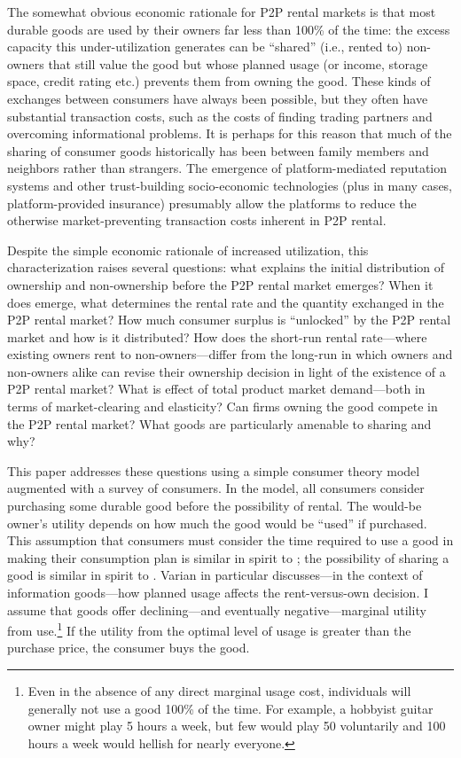 \documentclass[11pt]{article}
\begin{document}
The somewhat obvious economic rationale for P2P rental markets is that most durable goods are used by their owners far less than 100\% of the time: 
the excess capacity this under-utilization generates can be ``shared'' (i.e., rented to) non-owners that still value the good but whose planned usage (or income, storage space, credit rating etc.) prevents them from owning the good. 
These kinds of exchanges between consumers have always been possible, but they often have substantial transaction costs, such as the costs of finding trading partners and overcoming informational problems. 
It is perhaps for this reason that much of the sharing of consumer goods historically has been between family members and neighbors rather than strangers. 
The emergence of platform-mediated reputation systems and other trust-building socio-economic technologies (plus in many cases, platform-provided insurance) presumably allow the platforms to reduce the otherwise market-preventing transaction costs inherent in P2P rental. 

Despite the simple economic rationale of increased utilization, this characterization raises several questions:
what explains the initial distribution of ownership and non-ownership before the P2P rental market emerges?
When it does emerge, what determines the rental rate and the quantity exchanged in the P2P rental market? 
How much consumer surplus is ``unlocked'' by the P2P rental market and how is it distributed? 
How does the short-run rental rate---where existing owners rent to non-owners---differ from the long-run in which owners and non-owners alike can revise their ownership decision in light of the existence of a P2P rental market?  
What is effect of total product market demand---both in terms of market-clearing and elasticity?  
Can firms owning the good compete in the P2P rental market? 
What goods are particularly amenable to sharing and why?
  
This paper addresses these questions using a simple consumer theory model augmented with a survey of consumers. 
In the model, all consumers consider purchasing some durable good before the possibility of rental.   
The would-be owner's utility depends on how much the good would be ``used'' if purchased. 
This assumption that consumers must consider the time required to use a good in making their consumption plan is similar in spirit to \cite{becker1965theory}; the possibility of sharing a good is similar in spirit to \cite{varian2000}.
Varian in particular discusses---in the context of information goods---how planned usage affects the rent-versus-own decision.  
I assume that goods offer declining---and eventually negative---marginal utility from use.\footnote{Even in the absence of any direct marginal usage cost, individuals will generally not use a good 100\% of the time. 
For example, a hobbyist guitar owner might play 5 hours a week, but few would play 50 voluntarily and 100 hours a week would hellish for nearly everyone.} 
If the utility from the optimal level of usage is greater than the purchase price, the consumer buys the good. 
\end{document}
